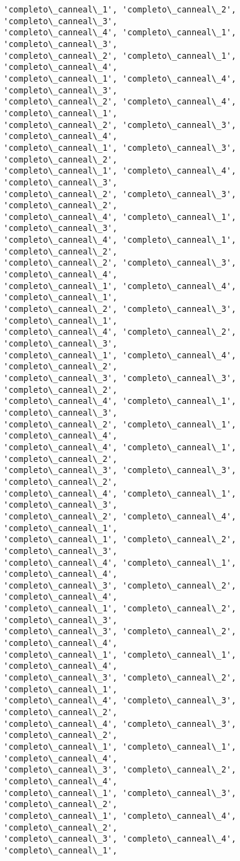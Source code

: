 \documentclass[11pt]{article}
\begin{document}
\begin{Verbatim}[commandchars=\\\{\}]
'completo\_canneal\_1', 'completo\_canneal\_2', 'completo\_canneal\_3',
'completo\_canneal\_4', 'completo\_canneal\_1', 'completo\_canneal\_3',
'completo\_canneal\_2', 'completo\_canneal\_1', 'completo\_canneal\_4',
'completo\_canneal\_1', 'completo\_canneal\_4', 'completo\_canneal\_3',
'completo\_canneal\_2', 'completo\_canneal\_4', 'completo\_canneal\_1',
'completo\_canneal\_2', 'completo\_canneal\_3', 'completo\_canneal\_4',
'completo\_canneal\_1', 'completo\_canneal\_3', 'completo\_canneal\_2',
'completo\_canneal\_1', 'completo\_canneal\_4', 'completo\_canneal\_3',
'completo\_canneal\_2', 'completo\_canneal\_3', 'completo\_canneal\_2',
'completo\_canneal\_4', 'completo\_canneal\_1', 'completo\_canneal\_3',
'completo\_canneal\_4', 'completo\_canneal\_1', 'completo\_canneal\_2',
'completo\_canneal\_2', 'completo\_canneal\_3', 'completo\_canneal\_4',
'completo\_canneal\_1', 'completo\_canneal\_4', 'completo\_canneal\_1',
'completo\_canneal\_2', 'completo\_canneal\_3', 'completo\_canneal\_1',
'completo\_canneal\_4', 'completo\_canneal\_2', 'completo\_canneal\_3',
'completo\_canneal\_1', 'completo\_canneal\_4', 'completo\_canneal\_2',
'completo\_canneal\_3', 'completo\_canneal\_3', 'completo\_canneal\_2',
'completo\_canneal\_4', 'completo\_canneal\_1', 'completo\_canneal\_3',
'completo\_canneal\_2', 'completo\_canneal\_1', 'completo\_canneal\_4',
'completo\_canneal\_4', 'completo\_canneal\_1', 'completo\_canneal\_2',
'completo\_canneal\_3', 'completo\_canneal\_3', 'completo\_canneal\_2',
'completo\_canneal\_4', 'completo\_canneal\_1', 'completo\_canneal\_3',
'completo\_canneal\_2', 'completo\_canneal\_4', 'completo\_canneal\_1',
'completo\_canneal\_1', 'completo\_canneal\_2', 'completo\_canneal\_3',
'completo\_canneal\_4', 'completo\_canneal\_1', 'completo\_canneal\_4',
'completo\_canneal\_3', 'completo\_canneal\_2', 'completo\_canneal\_4',
'completo\_canneal\_1', 'completo\_canneal\_2', 'completo\_canneal\_3',
'completo\_canneal\_3', 'completo\_canneal\_2', 'completo\_canneal\_4',
'completo\_canneal\_1', 'completo\_canneal\_1', 'completo\_canneal\_4',
'completo\_canneal\_3', 'completo\_canneal\_2', 'completo\_canneal\_1',
'completo\_canneal\_4', 'completo\_canneal\_3', 'completo\_canneal\_2',
'completo\_canneal\_4', 'completo\_canneal\_3', 'completo\_canneal\_2',
'completo\_canneal\_1', 'completo\_canneal\_1', 'completo\_canneal\_4',
'completo\_canneal\_3', 'completo\_canneal\_2', 'completo\_canneal\_4',
'completo\_canneal\_1', 'completo\_canneal\_3', 'completo\_canneal\_2',
'completo\_canneal\_1', 'completo\_canneal\_4', 'completo\_canneal\_2',
'completo\_canneal\_3', 'completo\_canneal\_4', 'completo\_canneal\_1',

\end{Verbatim}
\end{document}
